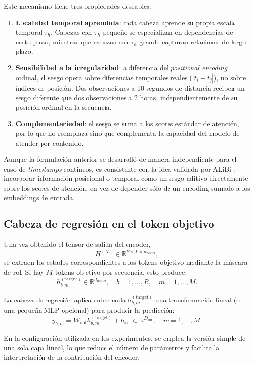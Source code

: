 Este mecanismo tiene tres propiedades deseables:
\begin{enumerate}
    \item \textbf{Localidad temporal aprendida}: cada cabeza aprende su propia escala temporal $\tau_h$. Cabezas con $\tau_h$ pequeño se especializan en dependencias de corto plazo, mientras que cabezas con $\tau_h$ grande capturan relaciones de largo plazo.
    \item \textbf{Sensibilidad a la irregularidad}: a diferencia del \emph{positional encoding} ordinal, el sesgo opera sobre diferencias temporales reales ($|t_i - t_j|$), no sobre índices de posición. Dos observaciones a 10 segundos de distancia reciben un sesgo diferente que dos observaciones a 2 horas, independientemente de su posición ordinal en la secuencia.
    \item \textbf{Complementariedad}: el sesgo se suma a los scores estándar de atención, por lo que no reemplaza sino que complementa la capacidad del modelo de atender por contenido.
\end{enumerate}

Aunque la formulación anterior se desarrolló de manera independiente para el caso de \emph{timestamps} continuos, es consistente con la idea validada por ALiBi \cite{press2022train}: incorporar información posicional o temporal como un sesgo aditivo directamente sobre los scores de atención, en vez de depender sólo de un encoding sumado a los embeddings de entrada.

\subsection{Cabeza de regresión en el token objetivo}
\label{sec:regression-head}

Una vez obtenido el tensor de salida del encoder,
\[
    H^{(N)} \in \mathbb{R}^{B \times L \times d_{\text{model}}},
\]
se extraen los estados correspondientes a los tokens objetivo mediante la máscara de rol. Si hay $M$ tokens objetivo por secuencia, esto produce:
\[
    h^{(\text{target})}_{b,m} \in \mathbb{R}^{d_{\text{model}}}, \quad b = 1,\dots,B,\quad m=1,\dots,M.
\]

La cabeza de regresión aplica sobre cada $h^{(\text{target})}_{b,m}$ una transformación lineal (o una pequeña MLP opcional) para producir la predicción:
\[
    \hat{y}_{b,m} = W_{\text{out}} h^{(\text{target})}_{b,m} + b_{\text{out}} \in \mathbb{R}^{D_{\text{out}}},
    \quad m=1,\dots,M.
\]

En la configuración utilizada en los experimentos, se emplea la versión simple de una sola capa lineal, lo que reduce el número de parámetros y facilita la interpretación de la contribución del encoder.

